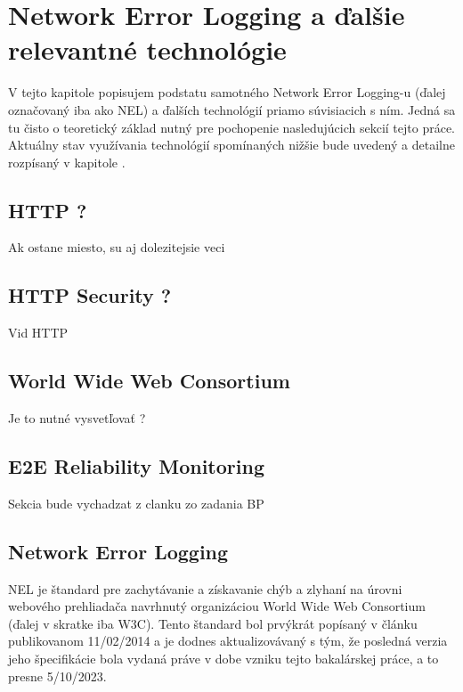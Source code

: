 \chapter{Network Error Logging a ďalšie relevantné technológie}
\label{nel-and-related-technologies}

V tejto kapitole popisujem podstatu samotného Network Error Logging-u (ďalej označovaný iba ako NEL) a ďalších technológií priamo súvisiacich s ním. Jedná sa tu čisto o teoretický základ nutný pre pochopenie nasledujúcich sekcií tejto práce. Aktuálny stav využívania technológií spomínaných nižšie bude uvedený a detailne rozpísaný v kapitole .

\section{HTTP ?}

Ak ostane miesto, su aj dolezitejsie veci

\section{HTTP Security ?}

Vid HTTP

\section{World Wide Web Consortium}

Je to nutné vysvetľovať ?

\section{E2E Reliability Monitoring}

Sekcia bude vychadzat z clanku zo zadania BP \cite{nel-client-side-measurement-e2e-reliability}


\section{Network Error Logging}

NEL je štandard pre zachytávanie a získavanie chýb a zlyhaní na úrovni webového prehliadača navrhnutý organizáciou World Wide Web Consortium (ďalej v skratke iba W3C). Tento štandard bol prvýkrát popísaný v článku publikovanom 11/02/2014 a je dodnes aktualizovávaný s tým, že posledná verzia jeho špecifikácie bola vydaná práve v dobe vzniku tejto bakalárskej práce, a to presne 5/10/2023. 

